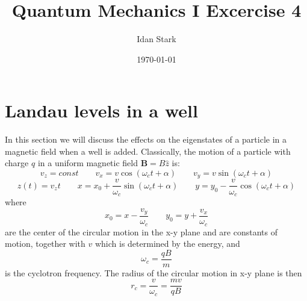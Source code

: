 \documentclass{article}
\title{Quantum Mechanics I Excercise 4}
\author{Idan Stark}
\date{\today}
\begin{document}
\maketitle

\section{Landau levels in a well}
In this section we will discuss the effects on the eigenstates of a particle in a magnetic field when a well is added.
Classically, the motion of a particle with charge $q$ in a uniform magnetic field $\boldsymbol{B} = B\hat{z}$ is:
\begin{equation}
    v_z = const \qquad v_x = v\cos(\omega_c t + \alpha) \qquad v_y = v\sin(\omega_c t + \alpha)
\end{equation}
\begin{equation}
    z(t) = v_z t \qquad x = x_0 + \frac{v}{\omega_c}\sin(\omega_c t + \alpha) \qquad y = y_0 - \frac{v}{\omega_c}\cos(\omega_c t + \alpha)
\end{equation}
where
\begin{equation}
    x_0 = x - \frac{v_y}{\omega_c} \qquad y_0 = y + \frac{v_x}{\omega_c}
\end{equation}
are the center of the circular motion in the x-y plane and are constants of motion, together with $v$ which is determined by the energy, and
\begin{equation}
    \omega_c = \frac{qB}{m}
\end{equation}
is the cyclotron frequency. The radius of the circular motion in x-y plane is then
\begin{equation}
    r_{c} = \frac{v}{\omega_c} = \frac{mv}{qB}
\end{equation}
\end{document}
